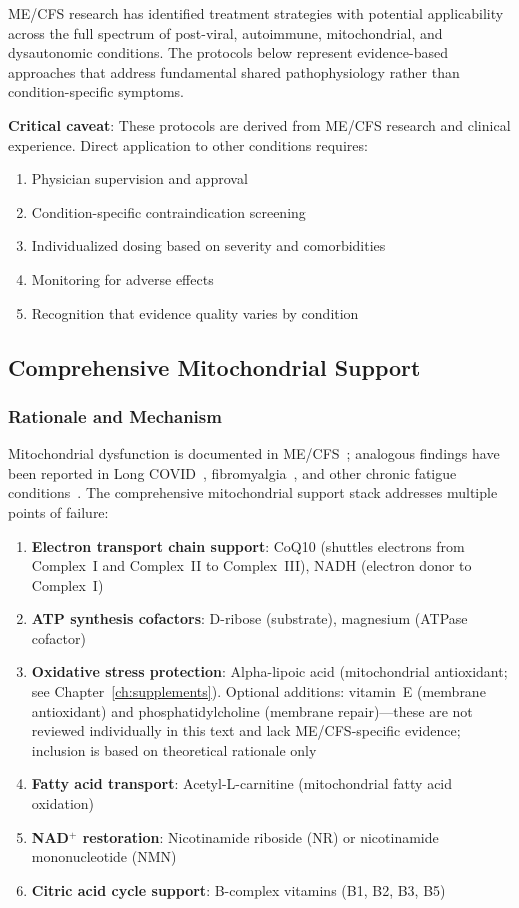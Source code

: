 ME/CFS research has identified treatment strategies with potential applicability across the full spectrum of post-viral, autoimmune, mitochondrial, and dysautonomic conditions. The protocols below represent evidence-based approaches that address fundamental shared pathophysiology rather than condition-specific symptoms.

\textbf{Critical caveat}: These protocols are derived from ME/CFS research and clinical experience. Direct application to other conditions requires:
\begin{enumerate}
    \item Physician supervision and approval
    \item Condition-specific contraindication screening
    \item Individualized dosing based on severity and comorbidities
    \item Monitoring for adverse effects
    \item Recognition that evidence quality varies by condition
\end{enumerate}

\subsection{Comprehensive Mitochondrial Support}
\label{sec:mito-support-universal}

\subsubsection{Rationale and Mechanism}

Mitochondrial dysfunction is documented in ME/CFS~\cite{wang2023wasf3,Syed2025}; analogous findings have been reported in Long COVID~\cite{Wu2025NRLongCOVID}, fibromyalgia~\cite{Cordero2013}, and other chronic fatigue conditions~\cite{Parikh2009}. The comprehensive mitochondrial support stack addresses multiple points of failure:

\begin{enumerate}
    \item \textbf{Electron transport chain support}: CoQ10 (shuttles electrons from Complex~I and Complex~II to Complex~III), NADH (electron donor to Complex~I)
    \item \textbf{ATP synthesis cofactors}: D-ribose (substrate), magnesium (ATPase cofactor)
    \item \textbf{Oxidative stress protection}: Alpha-lipoic acid (mitochondrial antioxidant; see Chapter~\ref{ch:supplements}). Optional additions: vitamin~E (membrane antioxidant) and phosphatidylcholine (membrane repair)---these are not reviewed individually in this text and lack ME/CFS-specific evidence; inclusion is based on theoretical rationale only
    \item \textbf{Fatty acid transport}: Acetyl-L-carnitine (mitochondrial fatty acid oxidation)
    \item \textbf{NAD$^+$ restoration}: Nicotinamide riboside (NR) or nicotinamide mononucleotide (NMN)
    \item \textbf{Citric acid cycle support}: B-complex vitamins (B1, B2, B3, B5)
\end{enumerate}

